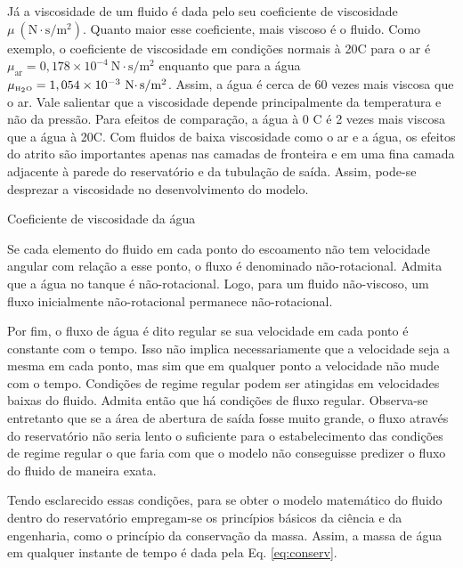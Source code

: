 Já a viscosidade de um fluido é dada pelo seu coeficiente de viscosidade $\mu\
(\text{N}\cdotp \text{s}/\text{m}^2)$. Quanto maior esse coeficiente, mais
viscoso é o fluido. Como exemplo, o coeficiente de viscosidade em condições
normais à 20\textdegree C para o ar é $\mu_{\text{ar}} = 0,178 \times 10^{-4}\
\text{N}\cdotp \text{s}/\text{m}^2$ enquanto que para a água
$\mu_{\tiny \text{\tiny H}_2\text{\tiny O}} = 1,054 \times 10^{-3}\
\text{N}\cdotp \text{s}/\text{m}^2$. Assim, a água é cerca de 60 vezes mais
viscosa que o ar.  Vale salientar que a viscosidade depende principalmente da
temperatura e não da pressão. Para efeitos de comparação, a água à 0\textdegree
C é 2 vezes mais viscosa que a água à 20\textdegree C. Com fluidos de baixa
viscosidade como o ar e a água, os efeitos do atrito são importantes apenas nas
camadas de fronteira e em uma fina camada adjacente à parede do reservatório e
da tubulação de saída.  Assim, pode-se desprezar a viscosidade no
desenvolvimento do modelo.

\Glossary{$\mu_{\text{ar}}$}{Coeficiente de viscosidade do ar}
         {Coeficiente de viscosidade da água}

Se cada elemento do fluido em cada ponto do escoamento não tem velocidade
angular com relação a esse ponto, o fluxo é denominado não-rotacional. Admita
que a água no tanque é não-rotacional. Logo, para um fluido não-viscoso, um
fluxo inicialmente não-rotacional permanece não-rotacional.

Por fim, o fluxo de água é dito regular se sua velocidade em cada ponto é
constante com o tempo. Isso não implica necessariamente que a velocidade seja a
mesma em cada ponto, mas sim que em qualquer ponto a velocidade não mude com o
tempo. Condições de regime regular podem ser atingidas em velocidades baixas do
fluido. Admita então que há condições de fluxo regular. Observa-se entretanto
que se a área de abertura de saída fosse muito grande, o fluxo através do
reservatório não seria lento o suficiente para o estabelecimento das
condições de regime regular o que faria com que o modelo não conseguisse
predizer o fluxo do fluido de maneira exata.

Tendo esclarecido essas condições, para se obter o modelo matemático do fluido
dentro do reservatório empregam-se os princípios básicos da ciência e da
engenharia, como o princípio da conservação da massa. Assim, a massa de água em
qualquer instante de tempo é dada pela Eq. \ref{eq:conserv}.

